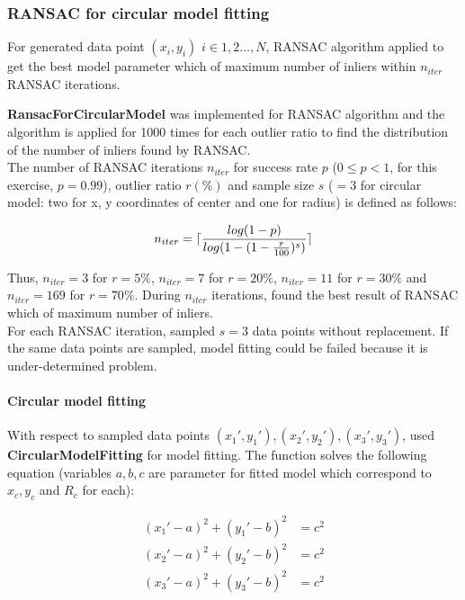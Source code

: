 \documentclass[paper=a4, fontsize=11pt]{scrartcl} %
\DeclarePairedDelimiter{\ceil}{\lceil}{\rceil}
\numberwithin{equation}{section} %
\numberwithin{figure}{section} %
\numberwithin{table}{section} %
\newcommand{\funcname}[1]{\textbf{#1}}
\begin{document}
\subsubsection{RANSAC for circular model fitting}

For generated data point $(x_{i}, y_{i})$ $i \in {1,2\dots,N}$, RANSAC algorithm applied to get the best model parameter which of maximum number of inliers within $n_{iter}$ RANSAC iterations.

\funcname{RansacForCircularModel} was implemented for RANSAC algorithm and the algorithm is applied for 1000 times for each outlier ratio to find the distribution of the number of inliers found by RANSAC. 
 \\

The number of RANSAC iterations $n_{iter}$ for success rate $p$ ($0 \leq p < 1$, for this exercise, $p = 0.99$), outlier ratio $r  (\%)$ and sample size $s$ ($=3$ for circular model: two for x, y coordinates of center and one for radius) is defined as follows: 

\begin{equation*}
n_{iter} = \ceil{ \frac{log(1 - p)}{log(1 - (1 - \frac{r}{100}) ^ {s})} }
\end{equation*}

Thus, $n_{iter} = 3$ for $r = 5\%$, $n_{iter} = 7$ for $r = 20\%$, $n_{iter} = 11$ for $r = 30\%$ and $n_{iter} = 169$ for $r = 70\%$. During $n_{iter}$ iterations, found the best result of RANSAC which of maximum number of inliers. \\

For each RANSAC iteration, sampled $s = 3$ data points without replacement. If the same data points are sampled, model fitting could be failed because it is under-determined problem. 

\paragraph{Circular model fitting}

With respect to sampled data points $(x_{1}', y_{1}'), (x_{2}', y_{2}'), (x_{3}', y_{3}')$, used \funcname{CircularModelFitting} for model fitting. The function solves the following equation (variables $a, b, c$ are parameter for fitted model which correspond to $x_c, y_c$ and $R_c$ for each):

\begin{align*}
(x_{1}' - a)^{2} + (y_{1}' - b)^{2} &= c^{2} \\
(x_{2}' - a)^{2} + (y_{2}' - b)^{2} &= c^{2} \\
(x_{3}' - a)^{2} + (y_{3}' - b)^{2} &= c^{2}
\end{align*}
\end{document}
